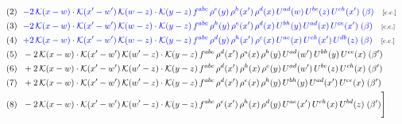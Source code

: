 \documentclass[9pt]{article}
\begin{document}
\begin{align}
&\quad\text{(2)}\ \ \textcolor{blue}{-2\,\mathcal{K}(x-w)\cdot\mathcal{K}(x'-w')\,\mathcal{K}(w-z)\cdot\mathcal{K}(y-z)\, f^{abc}\,\rho^{e}(y)\,\rho^{h}(x')\,\rho^{d}(x)\,U^{ad}(w)\,U^{be}(z)\,U^{ch}(x')\;(\beta)}\quad\text{\scriptsize[c.c.]}\notag\\
&\quad\text{(3)}\ \ \textcolor{blue}{-2\,\mathcal{K}(x-w)\cdot\mathcal{K}(x'-w')\,\mathcal{K}(w-z)\cdot\mathcal{K}(y-z)\, f^{abc}\,\rho^{h}(y)\,\rho^{e}(x')\,\rho^{d}(x)\,U^{bh}(y)\,U^{ad}(x)\,U^{ce}(x')\;(\beta)}\quad\text{\scriptsize[c.c.]}\notag\\
&\quad\text{(4)}\ \ \textcolor{blue}{+2\,\mathcal{K}(x-w)\cdot\mathcal{K}(x'-w')\,\mathcal{K}(w-z)\cdot\mathcal{K}(y-z)\, f^{abc}\,\rho^{d}(y)\,\rho^{h}(x')\,\rho^{e}(x)\,U^{ae}(x)\,U^{ch}(x')\,U^{db}(z)\;(\beta)}\quad\text{\scriptsize[c.c.]}\notag\\
&\quad\text{(5)}\ \ -2\, \mathcal{K}(x-w) \cdot \mathcal{K}(x'-w')\, \mathcal{K}(w'-z) \cdot \mathcal{K}(y-z)\, f^{abc}\, \rho^{d}(x')\,\rho^{e}(x)\, \rho^{h}(y)\,U^{ad}(w')\,U^{bh}(y)\,U^{ce}(x)\;(\beta')\notag\\
&\quad\text{(6)}\ \ + 2\, \mathcal{K}(x-w) \cdot \mathcal{K}(x'-w')\, \mathcal{K}(w'-z) \cdot \mathcal{K}(y-z)\, f^{abc}\, \rho^{d}(x')\,\rho^{h}(x)\, \rho^{e}(y)\,U^{ad}(w')\,U^{be}(z)\,U^{ch}(x)\;(\beta')\notag\\
&\quad\text{(7)}\ \ +2\, \mathcal{K}(x-w) \cdot \mathcal{K}(x'-w')\, \mathcal{K}(w'-z) \cdot \mathcal{K}(y-z)\, f^{abc}\, \rho^{d}(x')\,\rho^{e}(x)\, \rho^{h}(y)\,U^{bh}(y)\,U^{ad}(x')\,U^{ce}(x)\;(\beta')\notag\\
&\quad\text{(8)}\ \ -2\, \mathcal{K}(x-w) \cdot \mathcal{K}(x'-w')\, \mathcal{K}(w'-z) \cdot \mathcal{K}(y-z)\, f^{abc}\, \rho^{e}(x')\,\rho^{h}(x)\, \rho^{d}(y)\,U^{ae}(x')\,U^{ch}(x)\,U^{bd}(z)\;(\beta')\Bigg]\label{eq:three}
\end{align}
\end{document}
